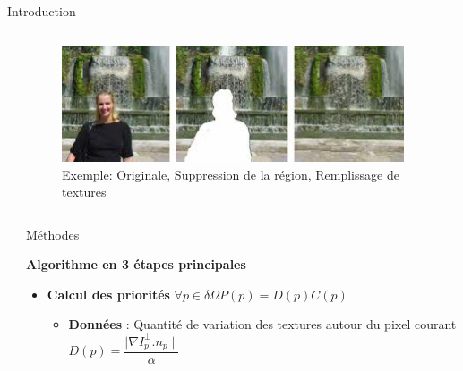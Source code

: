 \documentclass[final,hyperref={pdfpagelabels=false}]{beamer}
\begin{document}
\begin{frame}[t]
\begin{columns}[t]
\begin{column}{.930\textwidth}
\begin{block}{\Large Introduction}
\begin{columns}[t]
\begin{column}{.3\textwidth}
\end{column}

\begin{column}{.29\textwidth}

\begin{figure}[hb] %
\includegraphics[width=1.0\linewidth]{inpaintingex.jpeg}
\caption{Exemple:  Originale, Suppression de la région, Remplissage de textures }
\label{example}
\end{figure}
\end{column}

\end{columns}
\end{block}
\end{column}


\begin{column}{.02\textwidth} \end{column}
\end{columns}

\begin{columns}[t]

\begin{column}{.02\textwidth} \end{column}

\begin{column}{.465\textwidth} 


\begin{block}{\Large Méthodes}
 
\textbf{Algorithme en 3 étapes principales}
\begin{itemize}
\item \textbf{Calcul des priorités} $\forall p \in \delta\Omega P(p)=D(p)C(p) $
\begin{itemize}
\item \textbf{Données} : Quantité de variation des textures autour du pixel courant $D(p) = \dfrac{\mid \nabla I_p^{\perp}.n_p \mid}{\alpha} $
\end{itemize}


\end{itemize}
\end{block}
\end{column}
\end{columns}
\end{frame}
\end{document}
